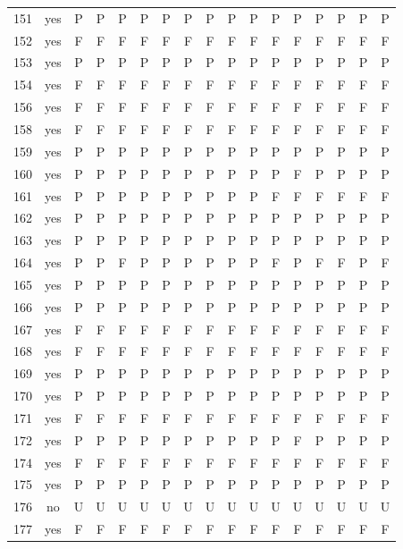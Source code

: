 \begin{table}[p]
\begin{tabular*}{\textwidth}{@{\extracolsep{\fill}}rcccccccccccccccc}
151 & yes & P & P & P & P & P & P & P & P & P & P & P & P & P & P & P\\
152 & yes & F & F & F & F & F & F & F & F & F & F & F & F & F & F & F\\
153 & yes & P & P & P & P & P & P & P & P & P & P & P & P & P & P & P\\
154 & yes & F & F & F & F & F & F & F & F & F & F & F & F & F & F & F\\
156 & yes & F & F & F & F & F & F & F & F & F & F & F & F & F & F & F\\
158 & yes & F & F & F & F & F & F & F & F & F & F & F & F & F & F & F\\
159 & yes & P & P & P & P & P & P & P & P & P & P & P & P & P & P & P\\
160 & yes & P & P & P & P & P & P & P & P & P & P & F & P & P & P & P\\
161 & yes & P & P & P & P & P & P & P & P & P & F & F & F & F & F & F\\
162 & yes & P & P & P & P & P & P & P & P & P & P & P & P & P & P & P\\
163 & yes & P & P & P & P & P & P & P & P & P & P & P & P & P & P & P\\
164 & yes & P & P & F & P & P & P & P & P & P & F & P & F & F & P & F\\
165 & yes & P & P & P & P & P & P & P & P & P & P & P & P & P & P & P\\
166 & yes & P & P & P & P & P & P & P & P & P & P & P & P & P & P & P\\
167 & yes & F & F & F & F & F & F & F & F & F & F & F & F & F & F & F\\
168 & yes & F & F & F & F & F & F & F & F & F & F & F & F & F & F & F\\
169 & yes & P & P & P & P & P & P & P & P & P & P & P & P & P & P & P\\
170 & yes & P & P & P & P & P & P & P & P & P & P & P & P & P & P & P\\
171 & yes & F & F & F & F & F & F & F & F & F & F & F & F & F & F & F\\
172 & yes & P & P & P & P & P & P & P & P & P & P & F & P & P & P & P\\
174 & yes & F & F & F & F & F & F & F & F & F & F & F & F & F & F & F\\
175 & yes & P & P & P & P & P & P & P & P & P & P & P & P & P & P & P\\
176 & no & U & U & U & U & U & U & U & U & U & U & U & U & U & U & U\\
177 & yes & F & F & F & F & F & F & F & F & F & F & F & F & F & F & F\\
\bottomrule\end{tabular*}\end{table}
\clearpage

